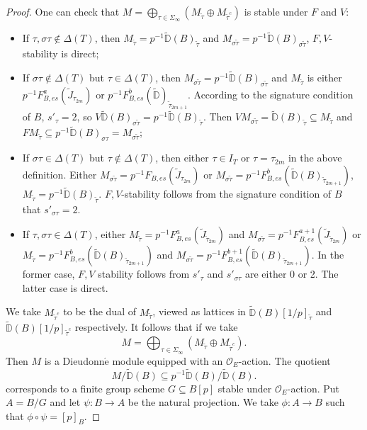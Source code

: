 \documentclass{article}
\begin{document}
\begin{proof}
One can check that $M=\bigoplus_{\tau\in\Sigma_{\infty}}(M_{\tilde\tau}\oplus M_{\tilde\tau^c})$ is stable under $F$ and $V$:
\begin{itemize}
	\item If $\tau,\sigma\tau\notin\Delta(T)$, then $M_{\tilde\tau}=p^{-1}\tilde{\mathbb{D}}(B)_{\tilde\tau}$ and $M_{\sigma\tilde\tau}=p^{-1}\tilde{\mathbb{D}}(B)_{\sigma\tilde\tau}$, $F,V$-stability is direct;
	\item If $\sigma\tau\notin\Delta(T)$ but $\tau\in\Delta(T)$, then $M_{\sigma\tilde\tau}=p^{-1}\tilde{\mathbb{D}}(B)_{\sigma\tilde\tau}$ and $M_{\tilde\tau}$ is either $p^{-1}F^a_{B,es}(\tilde{J}_{\tau_{2m}})$ or $p^{-1}F^b_{B,es}(\tilde{\mathbb{D}})_{\tilde\tau_{2m+1}}$. According to the signature condition of $B$, $s'_{\tau}=2$, so $V\tilde{\mathbb{D}}(B)_{\sigma\tilde\tau}=p^{-1}\tilde{\mathbb{D}}(B)_{\tilde\tau}$. Then $VM_{\sigma\tilde\tau}=\tilde{\mathbb{D}}(B)_{\tilde\tau}\subseteq M_{\tilde\tau}$ and $FM_{\tilde\tau}\subseteq p^{-1}\tilde{\mathbb{D}}(B)_{\sigma\tau}=M_{\sigma\tilde\tau}$;
	\item If $\sigma\tau\in\Delta(T)$ but $\tau\notin\Delta(T)$, then either $\tau\in I_T$ or $\tau=\tau_{2m}$ in the above definition. Either $M_{\sigma\tilde\tau}=p^{-1}F_{B,es}(\tilde{J}_{\tau_{2m}})$ or $M_{\sigma\tilde\tau}=p^{-1}F_{B,es}^b(\tilde{\mathbb{D}}(B)_{\tilde\tau_{2m+1}})$, $M_{\tilde\tau}=p^{-1}\tilde{\mathbb{D}}(B)_{\tilde\tau}$. $F,V$-stability follows from the signature condition of $B$ that $s'_{\sigma\tau}=2$.
	\item If $\tau,\sigma\tau\in\Delta(T)$, either $M_{\tilde\tau}=p^{-1}F^a_{B,es}(\tilde{J}_{\tilde\tau_{2m}})$ and $M_{\sigma\tilde\tau}=p^{-1}F^{a+1}_{B,es}(\tilde{J}_{\tilde\tau_{2m}})$ or $M_{\tilde\tau}=p^{-1}F^b_{B,es}(\tilde{\mathbb{D}}(B)_{\tilde\tau_{2m+1}})$ and $M_{\sigma\tilde\tau}=p^{-1}F^{b+1}_{B,es}(\tilde{\mathbb{D}}(B)_{\tilde\tau_{2m+1}})$. In the former case, $F,V$ stability follows from $s'_{\tau}$ and $s'_{\sigma\tau}$ are either 0 or 2. The latter case is direct.
\end{itemize}

We take $M_{\tilde\tau^c}$ to be the dual of $M_{\tilde\tau}$, viewed as lattices in $\tilde{\mathbb{D}}(B)[1/p]_{\tilde\tau}$ and $\tilde{\mathbb{D}}(B)[1/p]_{\tilde\tau^c}$ respectively. It follows that if we take 
\begin{equation}
M=\bigoplus_{\tau\in\Sigma_{\infty}}(M_{\tilde\tau}\oplus M_{\tilde\tau^c}).
\end{equation}
Then $M$ is a Dieudonn$\acute{\text{e}}$ module equipped with an $\mathcal{O}_E$-action. The quotient
\begin{equation}
M/\tilde{\mathbb{D}}(B)\subseteq p^{-1}\tilde{\mathbb{D}}(B)/\tilde{\mathbb{D}}(B).
\end{equation}
corresponds to a finite group scheme $G\subseteq B[p]$ stable under $\mathcal{O}_E$-action. Put $A=B/G$ and let $\psi:B\to A$ be the natural projection. We take $\phi:A\to B$ such that $\phi\circ\psi=[p]_B$.


\end{proof}
\end{document}
